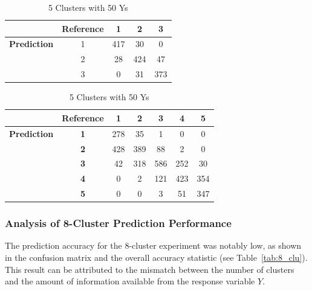 \documentclass{article}
\begin{document}
\begin{table}[htbp!]
  \begin{minipage}{0.45\textwidth}
    \centering
    \begin{tabular}{c|c|c|c|c}
              & \textbf{Reference} & 1 & 2 & 3 \\
    \hline
    \textbf{Prediction} & 1 & 417 & 30 & 0 \\
                        & 2 & 28 & 424 & 47 \\
                        & 3 & 0 & 31 & 373 \\
    \end{tabular}
    \caption{3 Clusters with 50 Ys}
    \label{tab:3_clu_50}
  \end{minipage}
  \hfill
  \begin{minipage}{0.45\textwidth}
    \centering
    \begin{tabular}{c|c|c|c|c|c|c}
      & \textbf{Reference} & \textbf{1} & \textbf{2} & \textbf{3} & \textbf{4} & \textbf{5} \\
      \hline
      \textbf{Prediction} & \textbf{1} & 278 & 35 & 1 & 0 & 0 \\
                          & \textbf{2} & 428 & 389 & 88 & 2 & 0 \\
                          & \textbf{3} & 42 & 318 & 586 & 252 & 30 \\
                          & \textbf{4} & 0 & 2 & 121 & 423 & 354 \\
                          & \textbf{5} & 0 & 0 & 3 & 51 & 347 \\
    \end{tabular}
    \caption{5 Clusters with 50 Ys}
    \label{tab:5_clu_50}
  \end{minipage}

\end{table}



\clearpage

\subsubsection{Analysis of 8-Cluster Prediction Performance}

The prediction accuracy for the 8-cluster experiment was notably low, as shown in the confusion matrix and the overall accuracy statistic (see Table~\ref{tab:8_clu}). This result can be attributed to the mismatch between the number of clusters and the amount of information available from the response variable \(Y\).
\end{document}
